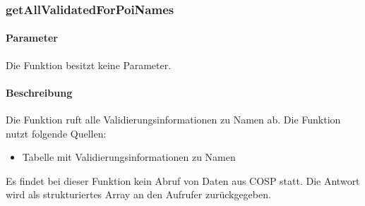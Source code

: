 \subsubsection{getAllValidatedForPoiNames}
\paragraph{Parameter} Die Funktion besitzt keine Parameter.
\paragraph{Beschreibung} Die Funktion ruft alle Validierungsinformationen zu Namen ab. Die Funktion nutzt folgende Quellen:
\begin{itemize}
	\item Tabelle mit Validierungsinformationen zu Namen
\end{itemize}
Es findet bei dieser Funktion kein Abruf von Daten aus {\glqq COSP\grqq} statt. Die Antwort wird als strukturiertes Array an den Aufrufer zurückgegeben.